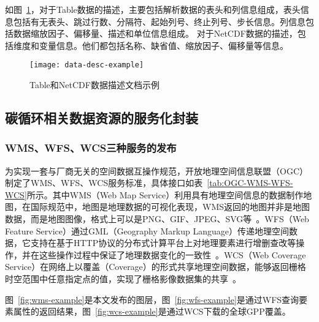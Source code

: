 如图~\ref{fig:data-desc-example}，对于Table数据的描述，主要包括解析数据的表头和列信息组成，表头信息包括有无表头、跳过行数、分隔符、起始列号、终止列号、步长信息。列信息包括数据缩放因子、偏移量、描述和单位信息组成。
对于NetCDF数据的描述，包括维度和变量信息。他们都包括名称、缺省值、缩放因子、偏移量等信息。

\begin{figure}[!htbp]
    \centering
    \texttt{[image: data-desc-example]}
    \caption{Table和NetCDF数据描述文档示例}
    \label{fig:data-desc-example}
\end{figure}

\subsection{碳循环相关数据资源的服务化封装}
\label{sec:data-service}
\subsubsection{WMS、WFS、WCS三种服务的发布}
\label{subsubsec:OGC}
为实现一套与厂商无关的空间数据互操作规范，开放地理空间信息联盟（OGC）制定了WMS、WFS、WCS服务标准，具体接口如表~\ref{tab:OGC-WMS-WFS-WCS}所示。其中WMS（Web Map Service）利用具有地理空间信息的数据制作地图，在国际规范中，地图是地理数据的可视化表现，WMS返回的地图并非是地图数据，而是地图图像，格式上可以是PNG、GIF、JPEG、SVG等~\cite{OGC-WMS}。WFS（Web Feature Service）通过GML（Geography Markup Language）传递地理空间数据，它支持在基于HTTP协议的分布式计算平台上对地理要素进行增删查改等操作，并在这些操作过程中保证了地理数据变化的一致性~\cite{OGC-WFS}。WCS（Web Coverage Service）在网络上以覆盖（Coverage）的形式共享地理空间数据，能够返回栅格时空范围中任意指定点的值，实现了栅格影像数据集的共享~\cite{OGC-WCS}。

图~\ref{fig:wms-example}是本文发布的图层，图~\ref{fig:wfs-example}是通过WFS查询要素属性的返回结果，图~\ref{fig:wcs-example}是通过WCS下载的全球GPP覆盖。

